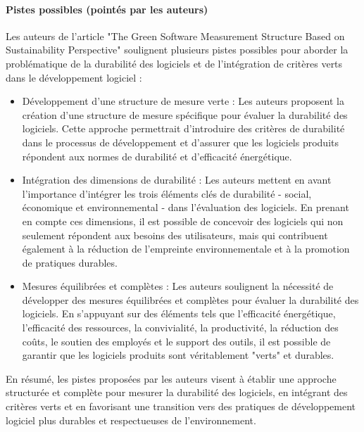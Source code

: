 \paragraph{Pistes possibles (pointés par les auteurs)}
Les auteurs de l'article "The Green Software Measurement Structure Based on Sustainability Perspective" soulignent plusieurs pistes possibles pour aborder la problématique de la durabilité des logiciels et de l'intégration de critères verts dans le développement logiciel :
\begin{itemize}
    \item Développement d'une structure de mesure verte : Les auteurs proposent la création d'une structure de mesure spécifique pour évaluer la durabilité des logiciels. Cette approche permettrait d'introduire des critères de durabilité dans le processus de développement et d'assurer que les logiciels produits répondent aux normes de durabilité et d'efficacité énergétique.
    \item Intégration des dimensions de durabilité : Les auteurs mettent en avant l'importance d'intégrer les trois éléments clés de durabilité - social, économique et environnemental - dans l'évaluation des logiciels. En prenant en compte ces dimensions, il est possible de concevoir des logiciels qui non seulement répondent aux besoins des utilisateurs, mais qui contribuent également à la réduction de l'empreinte environnementale et à la promotion de pratiques durables.
    \item Mesures équilibrées et complètes : Les auteurs soulignent la nécessité de développer des mesures équilibrées et complètes pour évaluer la durabilité des logiciels. En s'appuyant sur des éléments tels que l'efficacité énergétique, l'efficacité des ressources, la convivialité, la productivité, la réduction des coûts, le soutien des employés et le support des outils, il est possible de garantir que les logiciels produits sont véritablement "verts" et durables.
\end{itemize}
En résumé, les pistes proposées par les auteurs visent à établir une approche structurée et complète pour mesurer la durabilité des logiciels, en intégrant des critères verts et en favorisant une transition vers des pratiques de développement logiciel plus durables et respectueuses de l'environnement.

